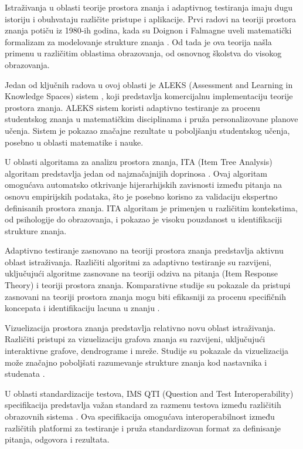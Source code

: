 \documentclass[conference]{IEEEtran}
\begin{document}
Istraživanja u oblasti teorije prostora znanja i adaptivnog testiranja imaju dugu istoriju i obuhvataju različite pristupe i aplikacije. Prvi radovi na teoriji prostora znanja potiču iz 1980-ih godina, kada su Doignon i Falmagne uveli matematički formalizam za modelovanje strukture znanja \cite{doignon1999}. Od tada je ova teorija našla primenu u različitim oblastima obrazovanja, od osnovnog školstva do visokog obrazovanja.

Jedan od ključnih radova u ovoj oblasti je ALEKS (Assessment and Learning in Knowledge Spaces) sistem \cite{aleks2009}, koji predstavlja komercijalnu implementaciju teorije prostora znanja. ALEKS sistem koristi adaptivno testiranje za procenu studentskog znanja u matematičkim disciplinama i pruža personalizovane planove učenja. Sistem je pokazao značajne rezultate u poboljšanju studentskog učenja, posebno u oblasti matematike i nauke.

U oblasti algoritama za analizu prostora znanja, ITA (Item Tree Analysis) algoritam predstavlja jedan od najznačajnijih doprinosa \cite{vanleeuwen2006}. Ovaj algoritam omogućava automatsko otkrivanje hijerarhijskih zavisnosti između pitanja na osnovu empirijskih podataka, što je posebno korisno za validaciju ekspertno definisanih prostora znanja. ITA algoritam je primenjen u različitim kontekstima, od psihologije do obrazovanja, i pokazao je visoku pouzdanost u identifikaciji strukture znanja.

Adaptivno testiranje zasnovano na teoriji prostora znanja predstavlja aktivnu oblast istraživanja. Različiti algoritmi za adaptivno testiranje su razvijeni, uključujući algoritme zasnovane na teoriji odziva na pitanja (Item Response Theory) i teoriji prostora znanja. Komparativne studije su pokazale da pristupi zasnovani na teoriji prostora znanja mogu biti efikasniji za procenu specifičnih koncepata i identifikaciju lacuna u znanju \cite{desmarais2012}.

Vizuelizacija prostora znanja predstavlja relativno novu oblast istraživanja. Različiti pristupi za vizuelizaciju grafova znanja su razvijeni, uključujući interaktivne grafove, dendrograme i mreže. Studije su pokazale da vizuelizacija može značajno poboljšati razumevanje strukture znanja kod nastavnika i studenata \cite{chen2014}.

U oblasti standardizacije testova, IMS QTI (Question and Test Interoperability) specifikacija predstavlja važan standard za razmenu testova između različitih obrazovnih sistema \cite{imsqti2012}. Ova specifikacija omogućava interoperabilnost između različitih platformi za testiranje i pruža standardizovan format za definisanje pitanja, odgovora i rezultata.
\end{document}
